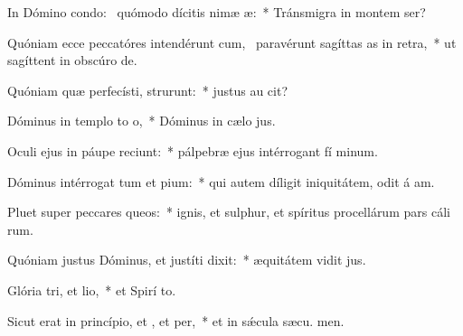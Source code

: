 \item In Dómino condo:~\pscross{} quómodo dícitis nimæ æ:~* Tránsmigra in montem  ser?
\item Quóniam ecce peccatóres intendérunt cum,~\pscross{} paravérunt sagíttas as in retra,~* ut sagíttent in obscúro  de.
\item Quóniam quæ perfecísti, strurunt:~* justus au  cit?
\item Dóminus in templo to o,~* Dóminus in cælo  jus.
\item Oculi ejus in páupe reciunt:~* pálpebræ ejus intérrogant fí minum.
\item Dóminus intérrogat tum et pium:~* qui autem díligit iniquitátem, odit á am.
\item Pluet super peccares queos:~* ignis, et sulphur, et spíritus procellárum pars cáli rum.
\item Quóniam justus Dóminus, et justíti dixit:~* æquitátem vidit  jus.
\item Glória tri, et lio,~* et Spirí to.
\item Sicut erat in princípio, et , et per,~* et in sǽcula sæcu. men.
